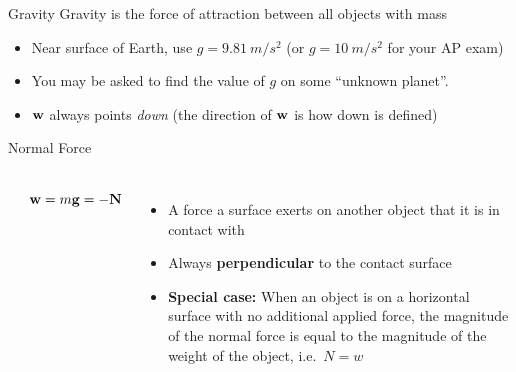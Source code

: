 \documentclass[12pt,compress,aspectratio=169]{beamer}
\newcommand{\mb}[1]{\ensuremath\mathbf{#1}}
\newcommand{\eq}[2]{\vspace{#1}{\Large\begin{displaymath}#2\end{displaymath}}}
\begin{document}
\begin{frame}{Gravity}
  Gravity is the force of attraction between all objects with mass
    
  \eq{-.2in}{
    \boxed{\mb{w}=m\mb{g}}
  }
  \begin{itemize}
  \item\vspace{-.15in}Near surface of Earth, use $g=\SI{9.81}{m/s^2}$ (or
    $g=\SI{10}{m/s^2}$ for your AP exam)
  \item You may be asked to find the value of $g$ on some ``unknown planet''.
  \item $\mb{w}$ always points \emph{down} (the direction of $\mb{w}$ is how
    down is defined)
%
  \end{itemize}    
\end{frame}



\begin{frame}{Normal Force}
  \begin{columns}
    \begin{center}
    \end{center}
    \begin{displaymath}
      \mb{w}=m\mb{g}=-\mb{N}
    \end{displaymath}
    
    \begin{itemize}
    \item A force a surface exerts on another object that it is in contact with
    \item Always \textbf{perpendicular} to the contact surface
    \item\textbf{Special case:} When an object is on a horizontal surface
      with no additional applied force, the magnitude of the normal force is
      equal to the magnitude of the weight of the object, i.e.\ $N=w$
    \end{itemize}
  \end{columns}
\end{frame}
\end{document}
